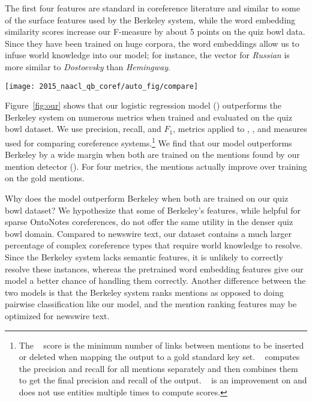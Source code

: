 The first four features are standard in coreference literature and similar to
some of the surface features used by the Berkeley system, while the word
embedding similarity scores increase our F-measure by about 5 points on the quiz
bowl data. Since they have been trained on huge corpora, the word embeddings
allow us to infuse world knowledge into our model; for instance, the vector for
\emph{Russian} is more similar to \emph{Dostoevsky} than \emph{Hemingway}.

\begin{figure*}[t!]
  \centering
  \texttt{[image: 2015\_naacl\_qb\_coref/auto\_fig/compare]}
  \caption{All models are trained and evaluated on quiz bowl data via five fold
    cross validation on $F_1$, precision, and recall. Berkeley//Gold refers
    to the mention detection used,  refers to our logistic regression
    model and \emph{QB Final} refers to the Berkeley model trained on quiz bowl
    data. Our model outperforms the Berkeley model on every metric when using
    our detected  mentions. When given gold mentions, 
    outperforms Berkeley \emph{QB Final} in five of nine metrics.}
  \label{fig:our}
\end{figure*}

Figure~\ref{fig:our} shows that our logistic regression model ()
outperforms the Berkeley system on numerous metrics when trained and evaluated
on the quiz bowl dataset. We use precision, recall, and $F_1$, metrics applied
to , , and  measures used for comparing
coreference systems.\footnote{The ~\cite{vilain1995model} score is the
  minimum number of links between mentions to be inserted or deleted when
  mapping the output to a gold standard key set.
  ~\cite{bagga1998algorithms} computes the precision and recall for
  all mentions separately and then combines them to get the final precision and
  recall of the output. ~\cite{luo2005coreference} is an improvement
  on  and does not use entities multiple times to compute scores.} We
find that our  model outperforms Berkeley by a wide margin when both are
trained on the mentions found by our mention detector (). For four
metrics, the  mentions actually improve over training on the gold
mentions.

Why does the  model outperform Berkeley when both are trained on our
quiz bowl dataset? We hypothesize that some of Berkeley's features, while
helpful for sparse OntoNotes coreferences, do not offer the same utility in the
denser quiz bowl domain. Compared to newswire text, our dataset contains a much
larger percentage of complex coreference types that require world knowledge to
resolve. Since the Berkeley system lacks semantic features, it is unlikely to
correctly resolve these instances, whereas the pretrained word embedding
features give our  model a better chance of handling them correctly.
Another difference between the two models is that the Berkeley system ranks
mentions as opposed to doing pairwise classification like our  model,
and the mention ranking features may be optimized for newswire text.

